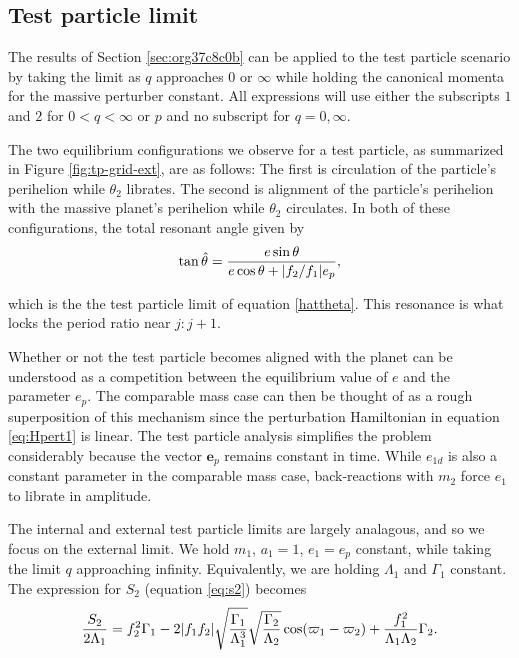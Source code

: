 \documentclass[usenatbib,onecolumn]{mnras}
\DeclarePairedDelimiter{\abs}{|}{|}
\begin{document}
\subsection{Test particle limit}
\label{sec:orgaf5be17}
The results of Section \ref{sec:org37c8c0b} can be applied to the
test particle scenario by taking the limit as \(q\) approaches \(0\) or
\(\infty\) while holding the canonical momenta for the massive perturber
constant.  All expressions will use either the subscripts \(1\)
and \(2\) for \(0<q<\infty\) or \(p\) and no subscript for \(q=0,\infty\).

The two equilibrium configurations we observe for a test particle, as
summarized in Figure \ref{fig:tp-grid-ext}, are as follows: The first is
circulation of the particle's perihelion while \(\theta_2\) librates.
The second is alignment of the particle's perihelion with the massive
planet's perihelion while \(\theta_2\) circulates.  In both of these
configurations, the total resonant angle given by
\begin{align}
  \tan\hat\theta = \frac{e\sin\theta}{e\cos\theta + \abs{f_2/f_1}e_p},
\end{align}

\noindent
which is the the test particle limit of equation \eqref{hattheta}.
This resonance is what locks the period ratio near \(j:j+1\).

Whether or not the test particle becomes aligned with the planet can
be understood as a competition between the equilibrium value of \(e\)
and the parameter \(e_p\). The comparable mass case can then be thought
of as a rough superposition of this mechanism since the perturbation
Hamiltonian in equation \eqref{eq:Hpert1} is linear. The test particle
analysis simplifies the problem considerably because the vector
\(\mathbf{e}_p\) remains constant in time. While \(e_{1d}\) is also a
constant parameter in the comparable mass case, back-reactions with
\(m_2\) force \(e_1\) to librate in amplitude.

The internal and external test particle limits are largely analagous,
and so we focus on the external limit.  We hold \(m_1\), \(a_1=1\),
\(e_1=e_p\) constant, while taking the limit \(q\) approaching
infinity. Equivalently, we are holding \(\Lambda_1\) and \(\Gamma_1\)
constant.  The expression for \(S_2\) (equation \eqref{eq:s2}) becomes
\begin{align}
  \label{eq:s2-canon}
  \frac{S_2}{2\Lambda_1} = f_2^2\Gamma_1
  -2\abs{f_1f_2}\sqrt{\frac{\Gamma_1}{\Lambda_1^3}}
  \sqrt{\frac{\Gamma_2}{\Lambda_2}}\cos(\varpi_1-\varpi_2)
  + \frac{f_1^2}{\Lambda_1\Lambda_2}\Gamma_2.
\end{align}
\end{document}
